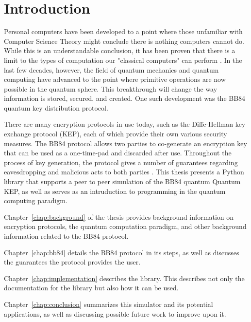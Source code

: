 \chapter{Introduction}
\label{chap:introduction}

Personal computers have been developed to a point where those unfamiliar with Computer Science Theory might conclude there is nothing computers cannot do.
While this is an understandable conclusion, it has been proven that there is a limit to the types of computation our "classical computers" can perform \cite{linz}.
In the last few decades, however, the field of quantum mechanics and quantum computing have advanced to the point where primitive operations are now possible in the quantum sphere.
This breakthrough will change the way information is stored, secured, and created.
One such development was the BB84 quantum key distribution protocol.

There are many encryption protocols in use today, such as the Diffe-Hellman key exchange protocol (KEP), each of which provide their own various security measures.
The BB84 protocol allows two parties to co-generate an encryption key that can be used as a one-time-pad and discarded after use.
Throughout the process of key generation, the protocol gives a number of guarantees regarding eavesdropping and malicious acts to both parties \cite{qcftgu}.
This thesis presents a Python library that supports a peer to peer simulation of the BB84 quantum Quantum KEP, as well as serves as an intruduction to programming in the quantum computing paradigm.


Chapter~\ref{chap:background} of the thesis provides background information on encryption protocols, the quantum computation paradigm, and other background information related to the BB84 protocol. 

Chapter~\ref{chap:bb84} details the BB84 protocol in its steps, as well as discusses the guarantees the protocol provides the user.

Chapter~\ref{chap:implementation} describes the library.
This describes not only the documentation for the library but also how it can be used.

Chapter~\ref{chap:conclusion} summarizes this simulator and its potential applications, as well as discussing possible future work to improve upon it.


